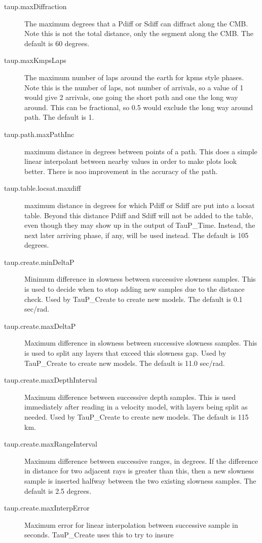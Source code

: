 \begin{description}
\item[taup.maxDiffraction] The maximum degrees that a Pdiff or Sdiff can diffract along the CMB.
 Note this is not the total distance, only the segment along the CMB. The default is 60 degrees.
 \item[taup.maxKmpsLaps] The maximum number of laps around the earth for
  kpms style phases.
  Note this is the number of laps, not number of arrivals, so a value of 1
  would give 2 arrivals, one going the short path and one the long way around. This can be fractional, so 0.5 would exclude the long way around
  path. The default is 1.
\item[taup.path.maxPathInc] maximum distance in degrees between points of a path. This does a simple linear interpolant between nearby values in order to make plots look better. There is noo improvement in the accuracy of the path.
\item[taup.table.locsat.maxdiff] maximum distance in degrees for which Pdiff
or Sdiff are put into a locsat table. Beyond this distance Pdiff and Sdiff will
not be added to the table, even though they may show up in the output of
TauP\_Time. Instead, the next later arriving phase, if any, will be used
instead. The default is 105 degrees.
\item[taup.create.minDeltaP] Minimum difference in slowness between
successive slowness samples. This is used to decide when to stop adding new
samples due to the distance check.
Used by TauP\_Create to create new models.
The default is 0.1 sec/rad.
\item[taup.create.maxDeltaP] Maximum difference in slowness between
successive slowness samples. This is used to split any layers that exceed
this slowness gap.
Used by TauP\_Create to create new models.
 The default is 11.0 sec/rad.
\item[taup.create.maxDepthInterval] Maximum difference between successive depth
samples. This is used immediately after reading in a velocity model, with
layers being split as needed.
Used by TauP\_Create to create new models.
 The default is 115 km.
\item[taup.create.maxRangeInterval] Maximum difference between successive
ranges, in degrees. If the difference in distance for two adjacent rays
is greater than this, then a new slowness sample is inserted halfway between
the two existing slowness samples.
The default is 2.5 degrees.
\item[taup.create.maxInterpError] Maximum error for linear interpolation
 between successive sample in seconds. TauP\_Create uses this to try to insure

\end{description}
